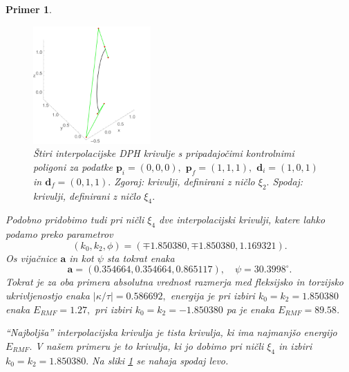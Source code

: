 \documentclass[12pt,a4paper,twoside]{article}
\theoremstyle{definition} %
\theoremstyle{plain} %
\theoremstyle{primerstyle}
\newtheorem{primer}[definicija]{Primer}
\numberwithin{equation}{section}  %
\newcommand{\aV}{\mathbf{a}}
\newcommand{\dV}{\mathbf{d}}
\newcommand{\pV}{\mathbf{p}}
\begin{document}
\begin{primer}
\begin{figure}[h]
	  \includegraphics[width=0.4\textwidth]{images/hermit4.pdf}
	  \caption[Interpolacijske DPH krivulje]{Štiri interpolacijske DPH krivulje s pripadajočimi kontrolnimi poligoni za podatke $\pV_i=(0,0,0),$ $\pV_f=(1,1,1),$ $\dV_i=(1,0,1)$ in $\dV_f=(0,1,1).$ Zgoraj: krivulji, definirani z ničlo $\xi_2.$ Spodaj: krivulji, definirani z ničlo $\xi_4.$}
	  \label{hermit_grafi_krivulj}
	\end{figure}
	
	Podobno pridobimo tudi pri ničli $\xi_4$ dve interpolacijski krivulji, katere lahko podamo preko parametrov
	\begin{equation}
		\label{par_resitev2}
		(k_0,k_2,\phi)=(\mp1.850380,\mp1.850380,1.169321).
	\end{equation}
	Os vijačnice $\aV$ in kot $\psi$ sta tokrat enaka
	\begin{equation}
		\label{par_resitev2_oskot}
		\aV=(0.354664,0.354664,0.865117),\quad\psi=30.3998^\circ.
	\end{equation}
	Tokrat je za oba primera absolutna vrednost razmerja med fleksijsko in torzijsko ukrivljenostjo enaka $|\kappa/\tau|=0.586692,$ energija je pri izbiri $k_0=k_2=1.850380$ enaka $E_{RMF}=1.27,$ pri izbiri $k_0=k_2=-1.850380$ pa je enaka $E_{RMF}=89.58.$
	
	``Najboljša'' interpolacijska krivulja je tista krivulja, ki ima najmanjšo energijo $E_{RMF}.$ V našem primeru je to krivulja, ki jo dobimo pri ničli $\xi_4$ in izbiri $k_0=k_2=1.850380.$ Na sliki \ref{hermit_grafi_krivulj} se nahaja spodaj levo.
	
\end{primer}
\end{document}
